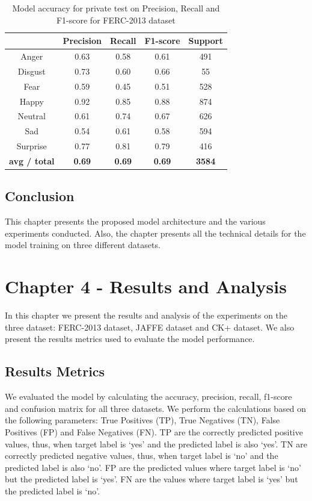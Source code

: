 \documentclass[master]{thesis-uestc}
\begin{document}
\begin{table}[ht]
\renewcommand{\arraystretch}{1.3}
\caption{Model accuracy for private test on Precision, Recall and F1-score for FERC-2013 dataset}
\label{table_fer2013_scores_private}
\begin{center}
\begin{tabular}{|c|c|c|c|c|}

\hline
 & Precision & Recall & F1-score & Support\\ \hline

Anger & 0.63 & 0.58 & 0.61 & 491\\ \hline
Disgust & 0.73 & 0.60 & 0.66 & 55\\ \hline
Fear & 0.59 & 0.45 & 0.51 & 528\\ \hline
Happy & 0.92 & 0.85 & 0.88 & 874\\ \hline
Neutral & 0.61 & 0.74 & 0.67 & 626\\ \hline
Sad & 0.54 & 0.61 & 0.58 & 594\\ \hline
Surprise & 0.77 & 0.81 & 0.79 & 416\\ \hline

\textbf{avg / total} & \textbf{0.69} & \textbf{0.69} & \textbf{0.69} & \textbf{3584}\\ \hline
\end{tabular}
\end{center}
\end{table}

\section{Conclusion}
This chapter presents the proposed model architecture and the various experiments conducted. Also, the chapter presents all the technical details for the model training on three different datasets.

\chapter{Chapter 4 - Results and Analysis}\label{chp4}
In this chapter we present the results and analysis of the experiments on the three dataset: FERC-2013 dataset, JAFFE dataset and CK+ dataset. We also present the results metrics used to evaluate the model performance.
\section{Results Metrics}
We evaluated the model by calculating the accuracy, precision, recall, f1-score and confusion matrix  for all three datasets. We perform the calculations based on the following parameters: True Positives (TP), True Negatives (TN), False Positives (FP) and False Negatives (FN). TP are the correctly predicted positive values, thus, when target label is `yes' and the predicted label is also `yes'. TN are correctly predicted negative values, thus, when target label is `no' and the predicted label is also `no'. FP are the predicted values where target label is `no' but the predicted label is `yes'. FN are the values where target label is `yes' but the predicted label is `no'.
\end{document}
